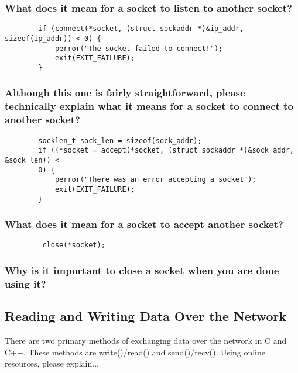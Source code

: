 \documentclass{article}
\begin{document}
	\subsubsection{What does it mean for a socket to listen to another socket?}
	\vspace{72pt}
	
	\begin{lstlisting}
		if (connect(*socket, (struct sockaddr *)&ip_addr, sizeof(ip_addr)) < 0) {
			perror("The socket failed to connect!");
			exit(EXIT_FAILURE);
		}
	\end{lstlisting}
	
	\subsubsection{Although this one is fairly straightforward, please technically explain what it means for a socket to connect to another socket?}
	\vspace{72pt}
	
	\begin{lstlisting}
		socklen_t sock_len = sizeof(sock_addr);
		if ((*socket = accept(*socket, (struct sockaddr *)&sock_addr, &sock_len)) <
		0) {
			perror("There was an error accepting a socket");
			exit(EXIT_FAILURE);
		}
	\end{lstlisting}
	
	\subsubsection{What does it mean for a socket to accept another socket?}
	\vspace{72pt}
	
	\begin{lstlisting}
		 close(*socket);
	\end{lstlisting}
	
	\subsubsection{Why is it important to close a socket when you are done using it?}
	\vspace{72pt}
	\pagebreak{}
	
	\begin{Large}
		\subsection{\textbf{Reading and Writing Data Over the Network}}
	\end{Large}
	There are two primary methods of exchanging data over the network in C and C++. These methods are write()/read() and send()/recv(). Using online resources, please explain...
	
\end{document}
